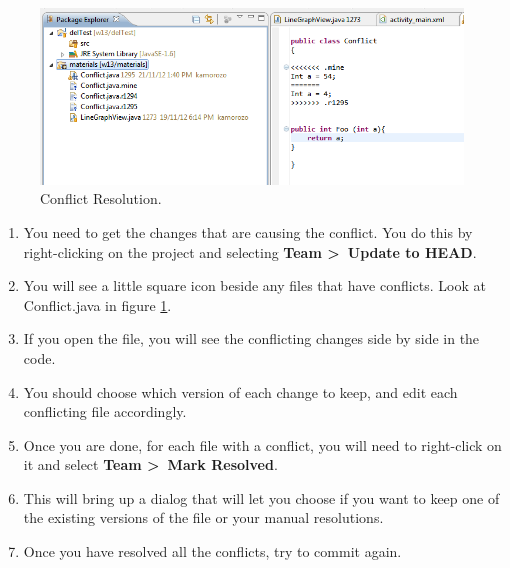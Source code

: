 \documentclass[10pt]{article}
\begin{document}
\begin{figure}[htbp]
\begin{center}
\includegraphics[width=\textwidth]{conflict.png}
\end{center}
\caption{\label{fig:conflict}Conflict Resolution.}
\end{figure}

\begin{enumerate}
\item You need to get the changes that are causing the conflict. You do this by right-clicking on the project and selecting \textbf{Team \textgreater~Update to HEAD}.
\item You will see a little square icon beside any files that have conflicts. Look at Conflict.java in figure \ref{fig:conflict}.
\item If you open the file, you will see the conflicting changes side by side in the code.
\item You should choose which version of each change to keep, and edit each conflicting file accordingly.
\item Once you are done, for each file with a conflict, you will need to right-click on it and select \textbf{Team \textgreater~Mark Resolved}.
\item This will bring up a dialog that will let you choose if you want to keep one of the existing versions of the file or your manual resolutions.
\item Once you have resolved all the conflicts, try to commit again.
\end{enumerate}

\end{document}
